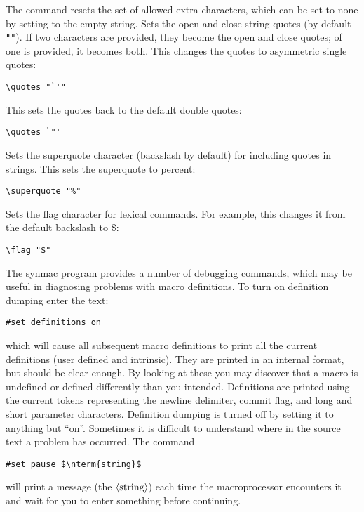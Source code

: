 \documentclass[12pt]{article}
\begin{document}
The command resets the set of allowed extra characters, which can be set to none by setting to the empty string.
Sets the open and close string quotes (by default \lstinline!""!). If two characters are provided, they become the open and close quotes; of one is provided, it becomes both. This changes the quotes to asymmetric single quotes:
\begin{lstlisting}[frame=single]
\quotes "`'"
\end{lstlisting}
This sets the quotes back to the default double quotes:
\begin{lstlisting}[frame=single]
\quotes `"'
\end{lstlisting}
Sets the superquote character (backslash by default) for including quotes in strings. This sets the superquote to percent:
\begin{lstlisting}[frame=single]
\superquote "%"
\end{lstlisting}
Sets the flag character for lexical commands. For example, this changes it from the default backslash to \$:
\begin{lstlisting}[frame=single]
\flag "$"
\end{lstlisting}
The synmac program provides a number of debugging commands, which may be useful in diagnosing problems with macro definitions.
To turn on definition dumping enter the text:
\begin{lstlisting}[frame=single]
#set definitions on
\end{lstlisting}
which will cause all subsequent macro definitions to print all the current definitions (user defined and intrinsic).
They are printed in an internal format, but should be clear enough.
By looking at these you may discover that a macro is undefined or defined differently than you intended.
Definitions are printed using the current tokens representing the newline delimiter, commit flag, and long and short parameter characters.
Definition dumping is turned off by setting it to anything but ``on''.
Sometimes it is difficult to understand where in the source text a problem has occurred.
The command
\begin{lstlisting}[frame=single,mathescape]
#set pause $\nterm{string}$
\end{lstlisting}
will print a message (the $\langle\mbox{string}\rangle$) each time the macroprocessor encounters it and wait for you to enter something before continuing.
\end{document}
